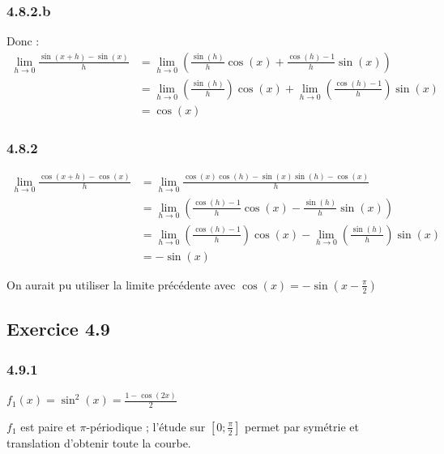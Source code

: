 \documentclass[a4paper,10pt]{report}
\begin{document}
\subsubsection*{4.8.2.b}
Donc :
\begin{equation*}
	\begin{split}
	\lim_{h \rightarrow 0} \frac{\sin(x+h) - \sin(x)}{h}
		&= \lim_{h \rightarrow 0} \left( \frac{\sin(h)}{h}\cos(x) + \frac{\cos(h) - 1}{h}\sin(x) \right) \\
		&= \lim_{h \rightarrow 0} \left( \frac{\sin(h)}{h} \right) \cos(x) + \lim_{h \rightarrow 0} \left( \frac{\cos(h) - 1}{h}\right) \sin(x)\\
		&= \cos(x)
	\end{split}
\end{equation*}

\subsubsection*{4.8.2}
\begin{equation*}
	\begin{split}
		\lim_{h \rightarrow 0} \frac{\cos(x+h) - \cos(x)}{h}
		&= \lim_{h \rightarrow 0} \frac{\cos(x)\cos(h) - \sin(x)\sin(h)-\cos(x)}{h} \\
		&= \lim_{h \rightarrow 0} \left( \frac{\cos(h)-1}{h}\cos(x) - \frac{\sin(h)}{h}\sin(x) \right) \\
		&= \lim_{h \rightarrow 0} \left( \frac{\cos(h) - 1}{h}\right) \cos(x) - \lim_{h \rightarrow 0} \left( \frac{\sin(h)}{h} \right)   \sin(x) \\
		&= -\sin(x)
	\end{split}
\end{equation*}

On aurait pu utiliser la limite précédente avec $\cos(x) = -\sin(x-\frac{\pi}{2})$

\subsection*{Exercice 4.9}

\subsubsection*{4.9.1}

$f_1(x) = \sin^2(x) = \frac{1 - \cos(2x)}{2}$

$f_1$ est paire et $\pi$-périodique ; l'étude sur $[0 ; \frac{\pi}{2}]$ permet par symétrie et translation
d'obtenir toute la courbe.
\end{document}
